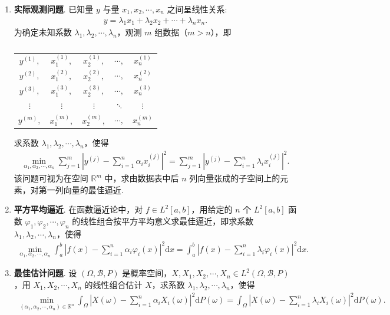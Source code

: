 \documentclass[../../main.tex]{subfiles}%
\begin{document}
\begin{example}\label{example:泛函分析--最小二乘法}
\begin{enumerate}[(1)]
\item \textbf{实际观测问题}. 已知量 $y$ 与量 $x_1, x_2, \cdots, x_n$ 之间呈线性关系:
\begin{align*}
y = \lambda_1 x_1 + \lambda_2 x_2 + \cdots + \lambda_n x_n.
\end{align*}
为确定未知系数 $\lambda_1, \lambda_2, \cdots, \lambda_n$，观测 $m$ 组数据（$m > n$），即
\begin{table}[H]
\centering
\caption{}
\begin{tabular}{ccccc}
$y^{(1)},$ & $x_1^{(1)},$ & $x_2^{(1)},$ & $\cdots,$ & $x_n^{(1)}$ \\
$y^{(2)},$ & $x_1^{(2)},$ & $x_2^{(2)},$ & $\cdots,$ & $x_n^{(2)}$ \\
$y^{(3)},$ & $x_1^{(3)},$ & $x_2^{(3)},$ & $\cdots,$ & $x_n^{(3)}$ \\
$\vdots$   & $\vdots$     & $\vdots$     & $\ddots$  & $\vdots$   \\
$y^{(m)},$ & $x_1^{(m)},$ & $x_2^{(m)},$ & $\cdots,$ & $x_n^{(m)}$ \\
\end{tabular}
\end{table}
求系数 $\lambda_1, \lambda_2, \cdots, \lambda_n$，使得
\begin{align*}
\min_{\alpha_1, \alpha_2, \cdots, \alpha_n} \sum\limits_{j=1}^{m} \left| y^{(j)} - \sum\limits_{i=1}^{n} \alpha_i x_i^{(j)} \right|^2 = \sum\limits_{j=1}^{m} \left| y^{(j)} - \sum\limits_{i=1}^{n} \lambda_i x_i^{(j)} \right|^2.
\end{align*}
该问题可视为在空间 $\mathbb{R}^m$ 中，求由数据表中后 $n$ 列向量张成的子空间上的元素，对第一列向量的最佳逼近.

\item \textbf{平方平均逼近}. 在函数逼近论中，对 $f \in L^2[a,b]$，用给定的 $n$ 个 $L^2[a,b]$ 函数 $\varphi_1, \varphi_2, \cdots, \varphi_n$ 的线性组合按平方平均意义求最佳逼近，即求系数 $\lambda_1, \lambda_2, \cdots, \lambda_n$，使得
\begin{align*}
\min_{\alpha_1, \alpha_2, \cdots, \alpha_n} \int_{a}^{b} \left| f(x) - \sum\limits_{i=1}^{n} \alpha_i \varphi_i(x) \right|^2 \mathrm{d}x = \int_{a}^{b} \left| f(x) - \sum\limits_{i=1}^{n} \lambda_i \varphi_i(x) \right|^2 \mathrm{d}x.
\end{align*}

\item \textbf{最佳估计问题}. 设 $(\Omega, \mathscr{B}, P)$ 是概率空间，$X, X_1, X_2, \cdots, X_n \in L^2(\Omega, \mathscr{B}, P)$，用 $X_1, X_2, \cdots, X_n$ 的线性组合估计 $X$，求系数 $\lambda_1, \lambda_2, \cdots, \lambda_n$，使得
\begin{align*}
\min_{(\alpha_1, \alpha_2, \cdots, \alpha_n) \in \mathbb{R}^n} \int_{\Omega} \left| X(\omega) - \sum\limits_{i=1}^{n} \alpha_i X_i(\omega) \right|^2 \mathrm{d}P(\omega) = \int_{\Omega} \left| X(\omega) - \sum\limits_{i=1}^{n} \lambda_i X_i(\omega) \right|^2 \mathrm{d}P(\omega).
\end{align*}
\end{enumerate}
\end{example}
\end{document}
